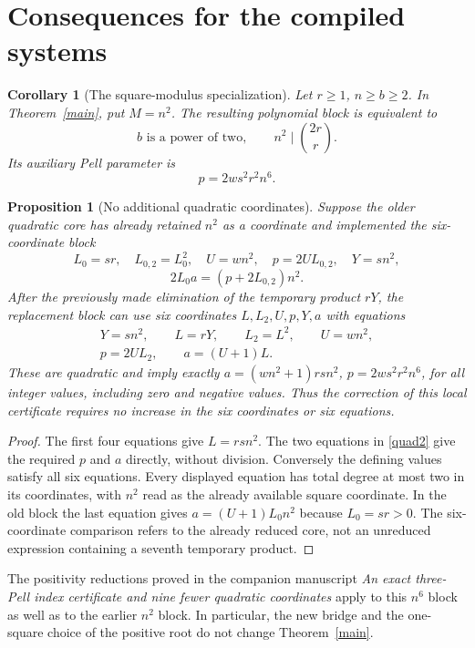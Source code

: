 \documentclass[11pt]{article}
\newtheorem{corollary}[theorem]{Corollary}
\newtheorem{proposition}[theorem]{Proposition}
\begin{document}
\section{Consequences for the compiled systems}

\begin{corollary}[The square-modulus specialization]
Let \(r\ge1\), \(n\ge b\ge2\).  In Theorem~\ref{main},
put \(M=n^2\).  The resulting polynomial block is equivalent to
\[
              b\text{ is a power of two},\qquad
                     n^2\mid\binom{2r}{r}.
\]
Its auxiliary Pell parameter is
\[
                         p=2ws^2r^2n^6.
\]
\end{corollary}

\begin{proposition}[No additional quadratic coordinates]
Suppose the older quadratic core has already retained \(n^2\)
as a coordinate and implemented the six-coordinate block
\[
 L_0=sr,\quad L_{0,2}=L_0^2,\quad U=wn^2,\quad
 p=2U L_{0,2},\quad Y=sn^2,
\]
\[
                    2L_0a=(p+2L_{0,2})n^2.
\]
After the previously made elimination of the temporary product
\(rY\), the replacement block can use six coordinates
\(L,L_2,U,p,Y,a\) with equations
\begin{gather}
 Y=sn^2,\qquad L=rY,\qquad L_2=L^2,
 \qquad U=wn^2,\label{quad1}\\
                  p=2UL_2,\qquad a=(U+1)L.
                  \label{quad2}
\end{gather}
These are quadratic and imply exactly
\(a=(wn^2+1)rsn^2\), \(p=2ws^2r^2n^6\), for all
integer values, including zero and negative values.
Thus the correction of this local certificate
requires no increase in the six coordinates or six equations.
\end{proposition}
\begin{proof}
The first four equations give \(L=rsn^2\).
The two equations in \eqref{quad2} give the required \(p\) and
\(a\) directly, without division.  Conversely the defining values satisfy
all six equations.  Every displayed equation has total degree
at most two in its coordinates, with \(n^2\) read as the
already available square coordinate.  In the old block the last
equation gives \(a=(U+1)L_0n^2\) because \(L_0=sr>0\).
The six-coordinate comparison refers to the already reduced core,
not an unreduced expression containing a seventh temporary product.
\end{proof}

The positivity reductions proved in the companion manuscript
\emph{An exact three-Pell index certificate and nine fewer quadratic
coordinates} apply to this \(n^6\) block as well as to the earlier
\(n^2\) block.  In particular, the new bridge and the one-square
choice of the positive root do not change Theorem~\ref{main}.
\end{document}
